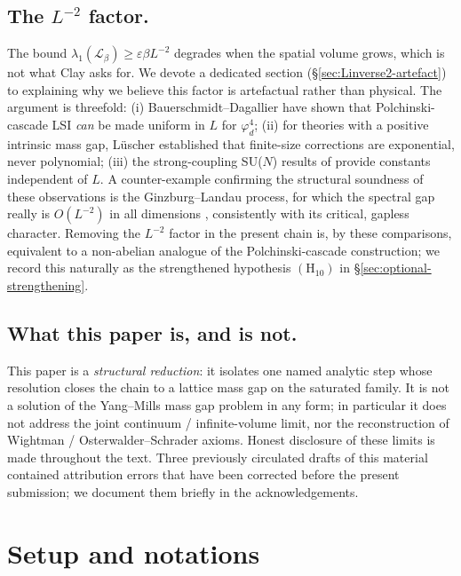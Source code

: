 \documentclass[11pt,reqno]{amsart}
\theoremstyle{plain}
\theoremstyle{definition}
\theoremstyle{remark}
\newcommand{\calL}{\mathcal{L}}
\begin{document}
\subsection{The $L^{-2}$ factor.}
The bound $\lambda_1(\calL_\beta) \ge \varepsilon \beta L^{-2}$ degrades when the spatial volume grows, which is not what Clay asks for. We devote a dedicated section (\S\ref{sec:Linverse2-artefact}) to explaining why we believe this factor is artefactual rather than physical. The argument is threefold:
(i) Bauerschmidt--Dagallier \cite{BD22} have shown that Polchinski-cascade LSI \emph{can} be made uniform in $L$ for $\varphi^4_d$;
(ii) for theories with a positive intrinsic mass gap, L\"uscher \cite{Luscher1986} established that finite-size corrections are exponential, never polynomial;
(iii) the strong-coupling SU($N$) results of \cite{CNS25, Nissim25} provide constants independent of $L$.
A counter-example confirming the structural soundness of these observations is the Ginzburg--Landau process, for which the spectral gap really is $O(L^{-2})$ in all dimensions \cite{Helffer1999}, consistently with its critical, gapless character. Removing the $L^{-2}$ factor in the present chain is, by these comparisons, equivalent to a non-abelian analogue of the Polchinski-cascade construction; we record this naturally as the strengthened hypothesis $(\mathrm{H}_{10})$ in \S\ref{sec:optional-strengthening}.

\subsection{What this paper is, and is not.}
This paper is a \emph{structural reduction}: it isolates one named analytic step whose resolution closes the chain to a lattice mass gap on the saturated family. It is not a solution of the Yang--Mills mass gap problem in any form; in particular it does not address the joint continuum / infinite-volume limit, nor the reconstruction of Wightman / Osterwalder--Schrader axioms. Honest disclosure of these limits is made throughout the text. Three previously circulated drafts of this material contained attribution errors that have been corrected before the present submission; we document them briefly in the acknowledgements.

\section{Setup and notations}
\label{sec:setup}
\end{document}
